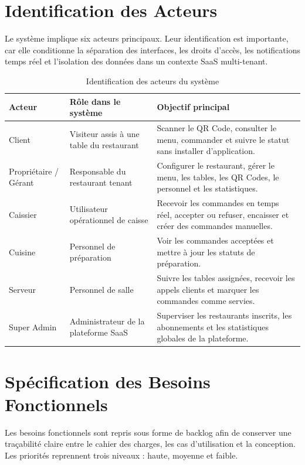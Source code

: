 \documentclass[12pt,a4paper]{report}
\begin{document}
\section{Identification des Acteurs}

Le système implique six acteurs principaux. Leur identification est importante, car elle conditionne la séparation des interfaces, les droits d'accès, les notifications temps réel et l'isolation des données dans un contexte SaaS multi-tenant.

\begin{table}[H]
    \centering
    \begin{tabularx}{\textwidth}{l X X}
        \toprule
        \rowcolor{primary!10}
        \textbf{Acteur} & \textbf{Rôle dans le système} & \textbf{Objectif principal} \\
        \midrule
        Client & Visiteur assis à une table du restaurant & Scanner le QR Code, consulter le menu, commander et suivre le statut sans installer d'application. \\
        Propriétaire / Gérant & Responsable du restaurant tenant & Configurer le restaurant, gérer le menu, les tables, les QR Codes, le personnel et les statistiques. \\
        Caissier & Utilisateur opérationnel de caisse & Recevoir les commandes en temps réel, accepter ou refuser, encaisser et créer des commandes manuelles. \\
        Cuisine & Personnel de préparation & Voir les commandes acceptées et mettre à jour les statuts de préparation. \\
        Serveur & Personnel de salle & Suivre les tables assignées, recevoir les appels clients et marquer les commandes comme servies. \\
        Super Admin & Administrateur de la plateforme SaaS & Superviser les restaurants inscrits, les abonnements et les statistiques globales de la plateforme. \\
        \bottomrule
    \end{tabularx}
    \caption{Identification des acteurs du système}
    \label{tab:actors}
\end{table}

\section{Spécification des Besoins Fonctionnels}

Les besoins fonctionnels sont repris sous forme de backlog afin de conserver une traçabilité claire entre le cahier des charges, les cas d'utilisation et la conception. Les priorités reprennent trois niveaux : haute, moyenne et faible.
\end{document}
